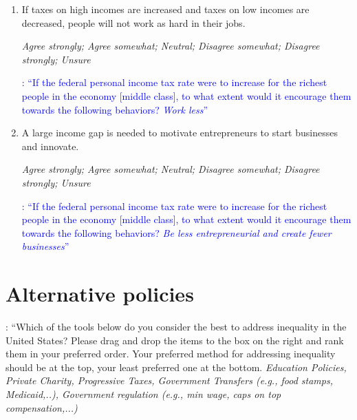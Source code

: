 \documentclass[11pt, headsepline]{article}
\newcommand{\blue}[1]{\textcolor{blue}{#1}}
\newcommand{\green}[1]{\textcolor{sharpgreen}{#1}}
\begin{document}
\begin{enumerate}[resume]
    \item If taxes on high incomes are increased and taxes on low incomes are decreased, people will not work as hard in their jobs.

    \textit{Agree strongly; Agree somewhat; Neutral; Disagree somewhat; Disagree strongly; Unsure}

    \blue{\cite{stantcheva2021understanding}: ``If the federal personal income tax rate were to increase for the richest people in the economy [middle class], to what extent would it encourage them towards the following behaviors? \textit{Work less}''}

    \item A large income gap is needed to motivate entrepreneurs to start businesses and innovate.

    \textit{Agree strongly; Agree somewhat; Neutral; Disagree somewhat; Disagree strongly; Unsure}

     \blue{\cite{stantcheva2021understanding}: ``If the federal personal income tax rate were to increase for the richest people in the economy [middle class], to what extent would it encourage them towards the following behaviors? \textit{Be less entrepreneurial and create fewer businesses}''}
    
\end{enumerate}

\section*{Alternative policies}

\green{\cite{kuziemko2015elastic}: ``Which of the tools below do you consider the best to address inequality in the United States? Please drag and drop the items to the box on the right and rank them in your preferred order. Your preferred method for addressing inequality should be at the top, your least preferred one at the bottom. \textit{Education Policies, Private Charity, Progressive Taxes, Government Transfers (e.g., food stamps, Medicaid,..), Government regulation (e.g., min wage, caps on top compensation,...)}}
\end{document}
